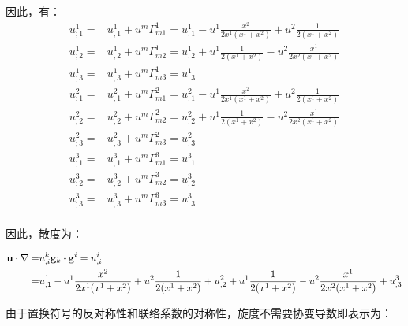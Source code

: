 \documentclass[UTF8,zihao=5]{ctexart}
\begin{document}
因此，有：
$$
    \begin{aligned}
        u^1_{;1}= & u^1_{,1} + u^m\Gamma^1_{m1}
        =u^1_{,1} - u^1 \frac{x^2}{2x^1(x^1+x^2)} + u^2 \frac{1}{2(x^1+x^2)} \\
        u^1_{;2}= & u^1_{,2} + u^m\Gamma^1_{m2}
        =u^1_{,2} + u^1 \frac{1}{2(x^1+x^2)} - u^2 \frac{x^1}{2x^2(x^1+x^2)} \\
        u^1_{;3}= & u^1_{,3} + u^m\Gamma^1_{m3}
        =u^1_{,3}                                                            \\
        u^2_{;1}= & u^2_{,1} + u^m\Gamma^2_{m1}
        =u^2_{,1} - u^1 \frac{x^2}{2x^1(x^1+x^2)} + u^2 \frac{1}{2(x^1+x^2)} \\
        u^2_{;2}= & u^2_{,2} + u^m\Gamma^2_{m2}
        =u^2_{,2} + u^1 \frac{1}{2(x^1+x^2)} - u^2 \frac{x^1}{2x^2(x^1+x^2)} \\
        u^2_{;3}= & u^2_{,3} + u^m\Gamma^2_{m3}
        =u^2_{,3}                                                            \\
        u^3_{;1}= & u^3_{,1} + u^m\Gamma^3_{m1}
        =u^3_{,1}                                                            \\
        u^3_{;2}= & u^3_{,2} + u^m\Gamma^3_{m2}
        =u^3_{,2}                                                            \\
        u^3_{;3}= & u^3_{,3} + u^m\Gamma^3_{m3}
        =u^3_{,3}                                                            \\
    \end{aligned}
$$

因此，散度为：

\begin{equation}
    \begin{aligned}
        {\mathbf{u}}\cdot{\mathbf{\nabla}}= & u^k_{;i}{\mathbf{g}}_k\cdot{\mathbf{g}}^i=u^i_{;i} \\=&
        u^1_{,1} - u^1 \frac{x^2}{2x^1(x^1+x^2)} + u^2 \frac{1}{2(x^1+x^2)}
        +
        u^2_{,2} + u^1 \frac{1}{2(x^1+x^2)} - u^2 \frac{x^1}{2x^2(x^1+x^2)}
        +
        u^3_{,3}
    \end{aligned}
    \label{eq:divu}
\end{equation}


由于置换符号的反对称性和联络系数的对称性，旋度不需要协变导数即表示为：
\end{document}
